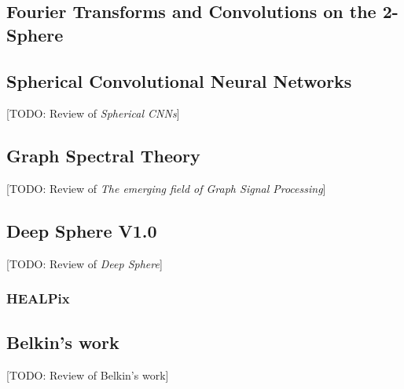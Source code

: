 \subsection{Fourier Transforms and Convolutions on the 2-Sphere}\label{sec:Fourier on the Sphere}

\subsection{Spherical Convolutional Neural Networks}
[TODO: Review of \textit{Spherical CNNs}]
\subsection{Graph Spectral Theory} \label{sec:Chapter1: Spectral Graph Theory}
[TODO: Review of \textit{The emerging field of Graph Signal Processing}]
\subsection{Deep Sphere V1.0}\label{sec:Chapter1:DeepSphere}
[TODO: Review of \textit{Deep Sphere}]
\subsubsection{HEALPix}\label{sec:Chapter1:HEALPix}
\subsection{Belkin's work}
[TODO: Review of Belkin's work]
